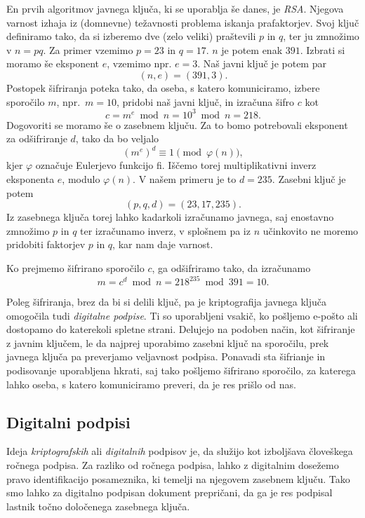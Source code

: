 \documentclass[isrm2, tisk]{fmfdelo}
\begin{document}
\begin{primer}[RSA]
    En prvih algoritmov javnega ključa, ki se uporablja še danes, je \textit{RSA}. Njegova varnost izhaja 
    iz (domnevne) težavnosti problema iskanja prafaktorjev. Svoj ključ definiramo tako, da si izberemo dve 
    (zelo veliki) praštevili $p$ in $q$, ter ju zmnožimo v $n = pq$. Za primer vzemimo $p = 23$ in 
    $q = 17$. $n$ je potem enak $391$. Izbrati si moramo še eksponent $e$, vzemimo npr. $e = 3$. Naš 
    javni ključ je potem par 
    $$ 
    (n, e) = (391, 3).
    $$
    Postopek šifriranja poteka tako, da oseba, s katero komuniciramo, izbere sporočilo $m$, npr.\ 
    $m = 10$, pridobi naš javni ključ, in izračuna šifro $c$ kot
    $$   
    c = m^e \bmod{n} = 10^3 \bmod{n} = 218.
    $$
    Dogovoriti se moramo še o zasebnem ključu. Za to bomo potrebovali eksponent za odšifriranje $d$,
    tako da bo veljalo 
    $$
    (m^e)^d \equiv 1 \pmod{\varphi(n)},
    $$ 
    kjer $\varphi$ označuje Eulerjevo funkcijo fi. Iščemo torej multiplikativni inverz eksponenta 
    $e$, modulo $\varphi(n)$. V našem primeru je to $d = 235$. Zasebni ključ je potem 
    $$ 
    (p, q, d) = (23, 17, 235). 
    $$
    Iz zasebnega ključa torej lahko kadarkoli izračunamo javnega, saj enostavno zmnožimo $p$ in $q$ 
    ter izračunamo inverz, v splošnem pa iz $n$ učinkovito ne moremo pridobiti faktorjev $p$ in $q$,
    kar nam daje varnost.

    Ko prejmemo šifrirano sporočilo $c$, ga odšifriramo tako, da izračunamo
    $$
    m = c^d \bmod{n} = 218^{235} \bmod{391} = 10.   
    $$
\end{primer}

Poleg šifriranja, brez da bi si delili ključ, pa je kriptografija javnega ključa omogočila tudi 
\textit{digitalne podpise}. Ti so uporabljeni vsakič, ko pošljemo e-pošto ali dostopamo do katerekoli 
spletne strani. Delujejo na podoben način, kot šifriranje z javnim ključem, le da najprej uporabimo 
zasebni ključ na sporočilu, prek javnega ključa pa preverjamo veljavnost podpisa. Ponavadi sta šifrianje 
in podisovanje uporabljena hkrati, saj tako pošljemo šifrirano sporočilo, za katerega lahko oseba, 
s katero komuniciramo preveri, da je res prišlo od nas.

\subsection{Digitalni podpisi}
Ideja \textit{kriptografskih} ali \textit{digitalnih} podpisov je, da služijo kot izboljšava človeškega 
ročnega podpisa. Za razliko od ročnega podpisa, lahko z digitalnim dosežemo pravo identifikacijo 
posameznika, ki temelji na njegovem zasebnem ključu. Tako smo lahko za digitalno podpisan dokument 
prepričani, da ga je res podpisal lastnik točno določenega zasebnega ključa. 
\end{document}
